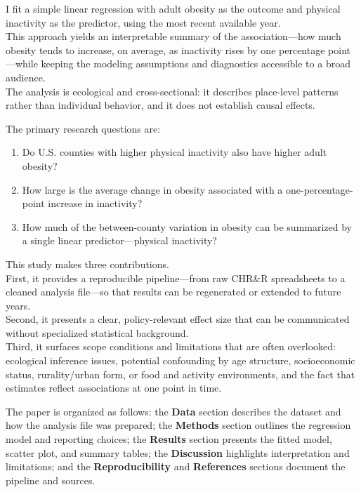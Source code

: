 \documentclass[
  letterpaper,
  DIV=11,
  numbers=noendperiod]{scrartcl}
\providecommand{\tightlist}{%
  \setlength{\itemsep}{0pt}\setlength{\parskip}{0pt}}\usepackage{longtable,booktabs,array}
\begin{document}
I fit a simple linear regression with adult obesity as the outcome and
physical inactivity as the predictor, using the most recent available
year.\\
This approach yields an interpretable summary of the association---how
much obesity tends to increase, on average, as inactivity rises by one
percentage point---while keeping the modeling assumptions and
diagnostics accessible to a broad audience.\\
The analysis is ecological and cross-sectional: it describes place-level
patterns rather than individual behavior, and it does not establish
causal effects.

The primary research questions are:

\begin{enumerate}
\def\labelenumi{\arabic{enumi}.}
\tightlist
\item
  Do U.S. counties with higher physical inactivity also have higher
  adult obesity?\\
\item
  How large is the average change in obesity associated with a
  one-percentage-point increase in inactivity?\\
\item
  How much of the between-county variation in obesity can be summarized
  by a single linear predictor---physical inactivity?
\end{enumerate}

This study makes three contributions.\\
First, it provides a reproducible pipeline---from raw CHR\&R
spreadsheets to a cleaned analysis file---so that results can be
regenerated or extended to future years.\\
Second, it presents a clear, policy-relevant effect size that can be
communicated without specialized statistical background.\\
Third, it surfaces scope conditions and limitations that are often
overlooked: ecological inference issues, potential confounding by age
structure, socioeconomic status, rurality/urban form, or food and
activity environments, and the fact that estimates reflect associations
at one point in time.

The paper is organized as follows: the \textbf{Data} section describes
the dataset and how the analysis file was prepared; the \textbf{Methods}
section outlines the regression model and reporting choices; the
\textbf{Results} section presents the fitted model, scatter plot, and
summary tables; the \textbf{Discussion} highlights interpretation and
limitations; and the \textbf{Reproducibility} and \textbf{References}
sections document the pipeline and sources.
\end{document}
